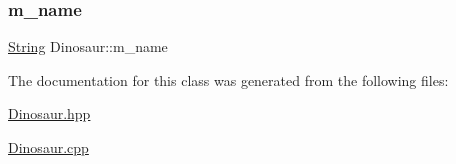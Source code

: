 \subsubsection{\texorpdfstring{m\+\_\+name}{m\_name}}
{\footnotesize\ttfamily \hyperlink{classString}{String} Dinosaur\+::m\+\_\+name\hspace{0.3cm}{\ttfamily [private]}}



The documentation for this class was generated from the following files\+:\begin{DoxyCompactItemize}
\item 
\hyperlink{Dinosaur_8hpp}{Dinosaur.\+hpp}\item 
\hyperlink{Dinosaur_8cpp}{Dinosaur.\+cpp}\end{DoxyCompactItemize}

